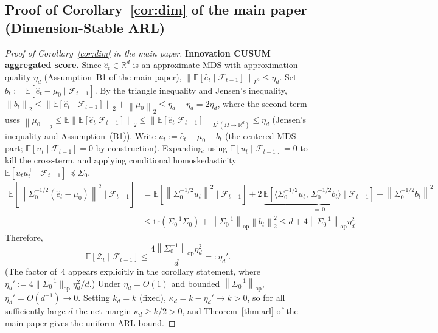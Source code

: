 \documentclass[bj,authoryear]{imsart}
\theoremstyle{plain}
\theoremstyle{definition}
\newcommand{\E}{\mathbb{E}}
\newcommand{\R}{\mathbb{R}}
\newcommand{\F}{\mathcal{F}}
\newcommand{\norm}[1]{\left\lVert #1 \right\rVert}
\newcommand{\given}{\mid}
\begin{document}
\subsection{Proof of Corollary~\ref{cor:dim} of the main paper (Dimension-Stable ARL)}
\label{app:proof-cordim}

\begin{proof}[Proof of Corollary~\ref{cor:dim} in the main paper]
  \textbf{Innovation CUSUM aggregated score.}
  Since $\hat{e}_t \in \R^d$ is an approximate MDS with approximation
  quality $\eta_d$ (Assumption~B1 of the main paper),
  $\norm{\E[\hat{e}_t\given\F_{t-1}]}_{L^2} \leq \eta_d$.
  Set $b_t := \E[\hat{e}_t - \mu_0\given\F_{t-1}]$.  By the triangle
  inequality and Jensen's inequality,
  $\norm{b_t}_2 \leq \norm{\E[\hat{e}_t\given\F_{t-1}]}_2 + \norm{\mu_0}_2
    \leq \eta_d + \eta_d = 2\eta_d$,
  where the second term uses $\norm{\mu_0}_2 \leq \E\norm{\E[\hat{e}_t|\F_{t-1}]}_2
  \leq \norm{\E[\hat{e}_t|\F_{t-1}]}_{L^2(\Omega\to\R^d)} \leq \eta_d$
  (Jensen's inequality and Assumption~(B1)).
  Write $u_t := \hat{e}_t - \mu_0 - b_t$ (the centered MDS part;
  $\E[u_t\given\F_{t-1}] = 0$ by construction).
  Expanding, using $\E[u_t\given\F_{t-1}] = 0$ to kill the cross-term, and
  applying conditional homoskedasticity $\E[u_t u_t^\top\given\F_{t-1}] \preceq \Sigma_0$,
  \begin{align*}
    \E\!\left[\norm{\Sigma_0^{-1/2}(\hat{e}_t-\mu_0)}^2\given\F_{t-1}\right]
    &= \E\!\left[\norm{\Sigma_0^{-1/2}u_t}^2\given\F_{t-1}\right]
       + 2\,\underbrace{\E\!\left[\langle\Sigma_0^{-1/2}u_t,\,\Sigma_0^{-1/2}b_t\rangle\given\F_{t-1}\right]}_{=\,0}
       + \norm{\Sigma_0^{-1/2}b_t}^2 \\
    &\leq \mathrm{tr}(\Sigma_0^{-1}\Sigma_0) + \norm{\Sigma_0^{-1}}_{\mathrm{op}}\norm{b_t}_2^2
     \leq d + 4\norm{\Sigma_0^{-1}}_{\mathrm{op}}\eta_d^2.
  \end{align*}
  Therefore,
  \[
    \E[\mathcal{Z}_t\given\F_{t-1}]
    \leq \frac{4\norm{\Sigma_0^{-1}}_{\mathrm{op}}\eta_d^2}{d} =: \eta_d'.
  \]
  (The factor of~4 appears explicitly in the corollary statement, where $\eta_d':=4\|\Sigma_0^{-1}\|_{\mathrm{op}}\eta_d^2/d$.)
  Under $\eta_d = O(1)$ and bounded $\norm{\Sigma_0^{-1}}_{\mathrm{op}}$,
  $\eta_d' = O(d^{-1}) \to 0$.
  Setting $k_d = k$ (fixed), $\kappa_d = k - \eta_d' \to k > 0$,
  so for all sufficiently large $d$ the net margin $\kappa_d \geq k/2 > 0$,
  and Theorem~\ref{thm:arl} of the main paper gives the uniform ARL bound.


\end{proof}
\end{document}
